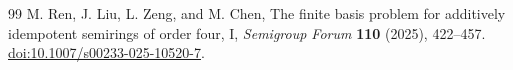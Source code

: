\documentclass[10pt,a4paper]{amsart}
\numberwithin{equation}{section}
\begin{document}
\begin{thebibliography}{99}
 M. Ren, J. Liu, L. Zeng, and M. Chen, The finite basis problem for additively idempotent semirings of order four, I, \emph{Semigroup Forum} \textbf{110} (2025), 422--457. \href{https://doi.org/10.1007/s00233-025-10520-7}{doi:10.1007/s00233-025-10520-7}.
\end{thebibliography}
\end{document}
